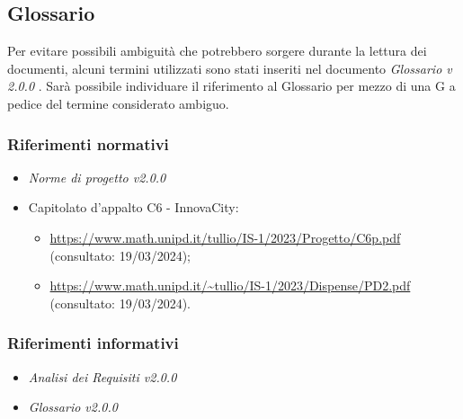 \subsection{Glossario}
Per evitare possibili ambiguità che potrebbero sorgere durante la lettura dei documenti,
alcuni termini utilizzati sono stati inseriti nel documento \textit{Glossario v 2.0.0 }.
Sarà possibile individuare il riferimento al Glossario per mezzo
di una G a pedice del termine considerato ambiguo.
\subsubsection{Riferimenti normativi}
\begin{itemize}
    \item \textit{Norme di progetto v2.0.0}
    \item Capitolato d'appalto C6 - InnovaCity:
        \begin{itemize}
            \item \url{https://www.math.unipd.it/tullio/IS-1/2023/Progetto/C6p.pdf} (consultato: 19/03/2024);
            \item \url{https://www.math.unipd.it/~tullio/IS-1/2023/Dispense/PD2.pdf} (consultato: 19/03/2024).
        \end{itemize}
\end{itemize}


\subsubsection{Riferimenti informativi}
\begin{itemize}
    \item \textit{Analisi dei Requisiti v2.0.0}
    \item \textit{Glossario v2.0.0}
\end{itemize}